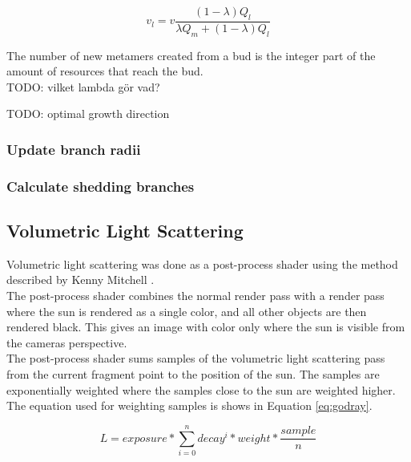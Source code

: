 \documentclass{article}
\begin{document}
	  			\begin{equation}
	  				\label{eq:vl}
	  				v_l = v\frac{(1 - \lambda) Q_l}{\lambda Q_m + (1 - \lambda)Q_l}
	  			\end{equation}
	  			
	  			The number of new metamers created from a bud is the integer part of the amount of resources that reach the bud. \cite{palubicki2009self} \\
	  			
	  			TODO: vilket lambda gör vad?
	  			
	  			TODO: optimal growth direction
	  			
	  		\subsubsection*{Update branch radii}
	  			
	  		\subsubsection*{Calculate shedding branches}
  			
  		\subsection{Volumetric Light Scattering}
  		
  			Volumetric light scattering was done as a post-process shader using the method described by Kenny Mitchell \citep{mitchell}. \\
  			
  			The post-process shader combines the normal render pass with a render pass where the sun is rendered as a single color, and all other objects are then rendered black. This gives an image with color only where the sun is visible from the cameras perspective. \\
  			
  			The post-process shader sums samples of the volumetric light scattering pass from the current fragment point to the position of the sun. The samples are exponentially weighted where the samples close to the sun are weighted higher. The equation used for weighting samples is shows in Equation \ref{eq:godray}. 
  			
  			\begin{equation}
  				\label{eq:godray}
  				L = exposure * \sum_{i = 0}^{n} decay^i * weight * \frac{sample}{n}
  			\end{equation}
  			
\end{document}

